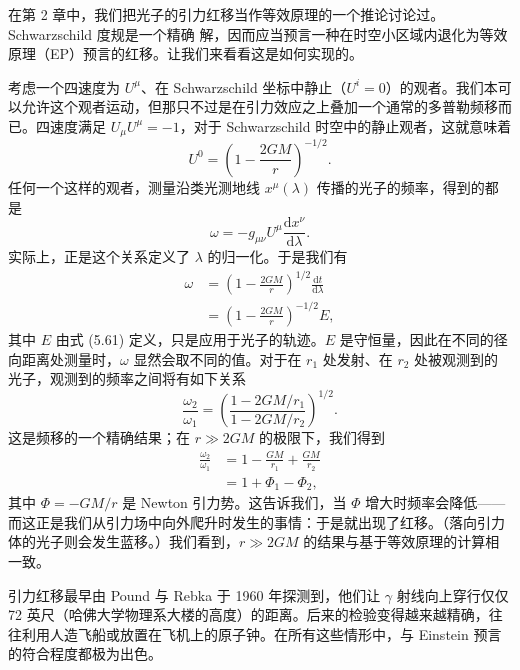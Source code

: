 在第 2 章中，我们把光子的引力红移当作等效原理的一个推论讨论过。Schwarzschild 度规是一个精确
解，因而应当预言一种在时空小区域内退化为等效原理（EP）预言的红移。让我们来看看这是如何实现的。

考虑一个四速度为 $U^\mu$、在 Schwarzschild 坐标中静止（$U^i = 0$）的观者。我们本可以允许这个观者运动，但那只不过是在引力效应之上叠加一个通常的多普勒频移而已。四速度满足 $U_\mu U^\mu = -1$，对于 Schwarzschild 时空中的静止观者，这就意味着
\begin{equation*}
U^0 = \left(1 - \frac{2GM}{r}\right)^{-1/2}.
\tag{5.99}
\end{equation*}
任何一个这样的观者，测量沿类光测地线 $x^\mu(\lambda)$ 传播的光子的频率，得到的都是
\begin{equation*}
\omega = -g_{\mu\nu}U^\mu\frac{\mathrm{d}x^\nu}{\mathrm{d}\lambda}.
\tag{5.100}
\end{equation*}
实际上，正是这个关系定义了 $\lambda$ 的归一化。于是我们有
\begin{align*}
\omega &= \left(1 - \frac{2GM}{r}\right)^{1/2}\frac{\mathrm{d}t}{\mathrm{d}\lambda}
\tag{5.101}\\
&= \left(1 - \frac{2GM}{r}\right)^{-1/2}E,
\tag{5.102}
\end{align*}
其中 $E$ 由式 (5.61) 定义，只是应用于光子的轨迹。$E$ 是守恒量，因此在不同的径向距离处测量时，$\omega$ 显然会取不同的值。对于在 $r_1$ 处发射、在 $r_2$ 处被观测到的光子，观测到的频率之间将有如下关系
\begin{equation*}
\frac{\omega_2}{\omega_1} = \left(\frac{1 - 2GM/r_1}{1 - 2GM/r_2}\right)^{1/2}.
\tag{5.103}
\end{equation*}
这是频移的一个精确结果；在 $r \gg 2GM$ 的极限下，我们得到
\begin{align*}
\frac{\omega_2}{\omega_1} &= 1 - \frac{GM}{r_1} + \frac{GM}{r_2}\\
&= 1 + \Phi_1 - \Phi_2,
\tag{5.104}
\end{align*}
其中 $\Phi = -GM/r$ 是 Newton 引力势。这告诉我们，当 $\Phi$ 增大时频率会降低——而这正是我们从引力场中向外爬升时发生的事情：于是就出现了红移。（落向引力体的光子则会发生蓝移。）我们看到，$r \gg 2GM$ 的结果与基于等效原理的计算相一致。

引力红移最早由 Pound 与 Rebka 于 1960 年探测到，他们让 $\gamma$ 射线向上穿行仅仅 72 英尺（哈佛大学物理系大楼的高度）的距离。后来的检验变得越来越精确，往往利用人造飞船或放置在飞机上的原子钟。在所有这些情形中，与 Einstein 预言的符合程度都极为出色。

